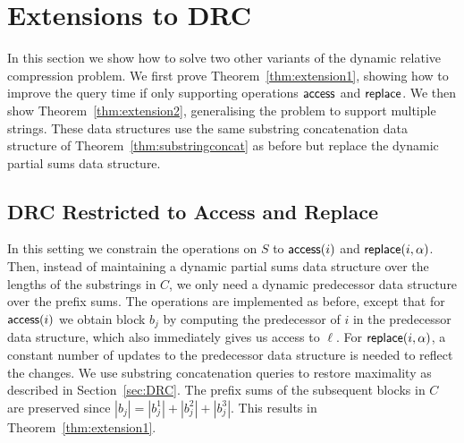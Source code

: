 \section{Extensions to DRC}\label{sec:extensions}
In this section we show how to solve two other variants of the dynamic relative compression problem. We first prove Theorem~\ref{thm:extension1}, showing how to improve the query time if only supporting operations $\mathsf{access}$ and $\mathsf{replace}$. We then show Theorem~\ref{thm:extension2}, generalising the problem to support multiple strings. These data structures use the same substring concatenation data structure of Theorem~\ref{thm:substringconcat} as before but replace the dynamic partial sums data structure.

\subsection{DRC Restricted to Access and Replace}
In this setting we constrain the operations on $S$ to $\mathsf{access}(i)$ and $\mathsf{replace}(i, \alpha)$.
Then, instead of maintaining a dynamic partial sums data structure over the lengths of the substrings in $C$, we only need a dynamic predecessor data structure over the prefix sums. 
The operations are implemented as before, except that for $\mathsf{access}(i)$ we obtain block $b_j$ by computing the predecessor of $i$ in the predecessor data structure, which also immediately gives us access to $\ell$. 
For $\mathsf{replace}(i, \alpha)$, a constant number of updates to the predecessor data structure is needed to reflect the changes. We use substring concatenation queries to restore maximality as described in Section~\ref{sec:DRC}. The prefix sums of the subsequent blocks in $C$ are preserved since $|b_j|=|b_j^1|+|b_j^2|+|b_j^3|$.
This results in Theorem~\ref{thm:extension1}.






